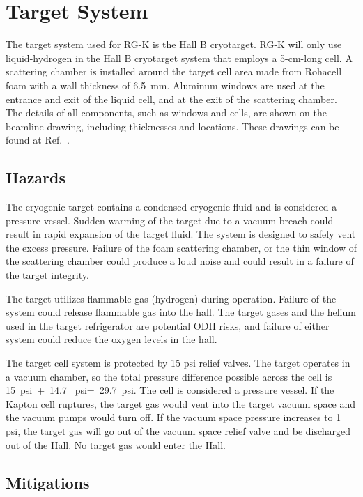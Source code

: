 \section{Target System}

The target system used for RG-K is the Hall B cryotarget. RG-K will only use liquid-hydrogen in the Hall B
cryotarget system that employs a 5-cm-long cell. A scattering chamber is installed around the target cell
area made from Rohacell foam with a wall thickness of 6.5~mm. Aluminum windows are used at the entrance and
exit of the liquid cell, and at the exit of the scattering chamber. The details of all components, such as
windows and cells, are shown on the beamline drawing, including thicknesses and locations. These drawings can
be found at Ref.~\cite{engineering-page}.

\subsection{Hazards} 

The cryogenic target contains a condensed cryogenic fluid and is considered a pressure vessel. Sudden warming
of the target due to a vacuum breach could result in rapid expansion of the target fluid. The system is designed
to safely vent the excess pressure. Failure of the foam scattering chamber, or the thin window of the scattering
chamber could produce a loud noise and could result in a failure of the target integrity.

The target utilizes flammable gas (hydrogen) during operation. Failure of the system could release flammable gas
into the hall. The target gases and the helium used in the target refrigerator are potential ODH risks, and failure
of either system could reduce the oxygen levels in the hall.

The target cell system is protected by 15 psi relief valves. The target operates in a vacuum chamber, so the total
pressure difference possible across the cell is 15~psi~+~14.7 ~psi=~29.7~psi. The cell is considered a pressure
vessel. If the Kapton cell ruptures, the target gas would vent into the target vacuum space and the vacuum pumps
would turn off. If the vacuum space pressure increases to 1 psi, the target gas will go out of the vacuum space
relief valve and be discharged out of the Hall. No target gas would enter the Hall.

\subsection{Mitigations}

